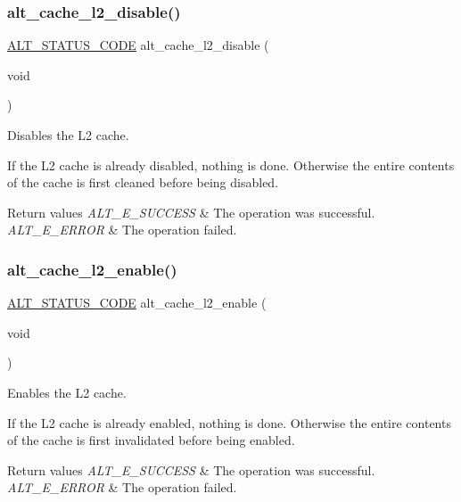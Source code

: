 \subsubsection{\texorpdfstring{alt\_cache\_l2\_disable()}{alt\_cache\_l2\_disable()}}
{\footnotesize\ttfamily \mbox{\hyperlink{hwlib_8h_abdb0d369f069723ca55d6c94bcaaaa12}{A\+L\+T\+\_\+\+S\+T\+A\+T\+U\+S\+\_\+\+C\+O\+DE}} alt\+\_\+cache\+\_\+l2\+\_\+disable (\begin{DoxyParamCaption}\item[{void}]{ }\end{DoxyParamCaption})}

Disables the L2 cache.

If the L2 cache is already disabled, nothing is done. Otherwise the entire contents of the cache is first cleaned before being disabled.


\begin{DoxyRetVals}{Return values}
{\em A\+L\+T\+\_\+\+E\+\_\+\+S\+U\+C\+C\+E\+SS} & The operation was successful. \\
\hline
{\em A\+L\+T\+\_\+\+E\+\_\+\+E\+R\+R\+OR} & The operation failed. \\
\hline
\end{DoxyRetVals}
\mbox{\label{group__CACHE__L2_gac2d766315c914d39ea4fabc35342146a}} 
\subsubsection{\texorpdfstring{alt\_cache\_l2\_enable()}{alt\_cache\_l2\_enable()}}
{\footnotesize\ttfamily \mbox{\hyperlink{hwlib_8h_abdb0d369f069723ca55d6c94bcaaaa12}{A\+L\+T\+\_\+\+S\+T\+A\+T\+U\+S\+\_\+\+C\+O\+DE}} alt\+\_\+cache\+\_\+l2\+\_\+enable (\begin{DoxyParamCaption}\item[{void}]{ }\end{DoxyParamCaption})}

Enables the L2 cache.

If the L2 cache is already enabled, nothing is done. Otherwise the entire contents of the cache is first invalidated before being enabled.


\begin{DoxyRetVals}{Return values}
{\em A\+L\+T\+\_\+\+E\+\_\+\+S\+U\+C\+C\+E\+SS} & The operation was successful. \\
\hline
{\em A\+L\+T\+\_\+\+E\+\_\+\+E\+R\+R\+OR} & The operation failed. \\
\hline
\end{DoxyRetVals}
\mbox{\label{group__CACHE__L2_gaa8a03246338e3186f8f465e9f92f96c7}} 
